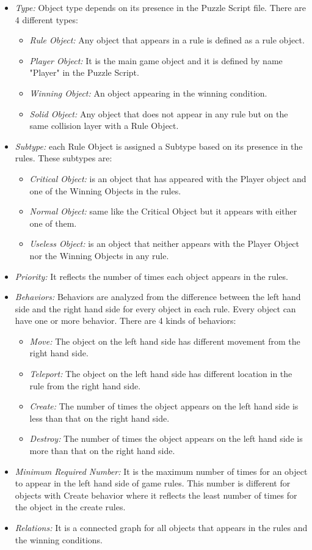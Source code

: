 \documentclass[letterpaper]{article}
\begin{document}
\begin{itemize}
	\item \emph{Type:} Object type depends on its presence in the Puzzle Script file. There are 4 different types:
	\begin{itemize}
		\item \emph{Rule Object:} Any object that appears in a rule is defined as a rule object.
		\item \emph{Player Object:} It is the main game object and it is defined by name "Player" in the Puzzle Script.
		\item \emph{Winning Object:} An object appearing in the winning condition.
		\item \emph{Solid Object:} Any object that does not appear in any rule but on the same collision layer with a Rule Object.
	\end{itemize}
	\item \emph{Subtype:} each Rule Object is assigned a Subtype based on its presence in the rules. These subtypes are:
	\begin{itemize}
		\item \emph{Critical Object:} is an object that has appeared with the Player object and one of the Winning Objects in the rules.
		\item \emph{Normal Object:} same like the Critical Object but it appears with either one of them.
		\item \emph{Useless Object:} is an object that neither appears with the Player Object nor the Winning Objects in any rule.
	\end{itemize}
	\item \emph{Priority:} It reflects the number of times each object appears in the rules.
	\item \emph{Behaviors:} Behaviors are analyzed from the difference between the left hand side and the right hand side for every object in each rule. Every object can have one or more behavior. There are 4 kinds of behaviors:
		\begin{itemize}
			\item \emph{Move:} The object on the left hand side has different movement from the right hand side.
			\item \emph{Teleport:} The object on the left hand side has different location in the rule from the right hand side.
			\item \emph{Create:} The number of times the object appears on the left hand side is less than that on the right hand side.
			\item \emph{Destroy:} The number of times the object appears on the left hand side is more than that on the right hand side.
		\end{itemize}
	\item \emph{Minimum Required Number:} It is the maximum number of times for an object to appear in the left hand side of game rules. This number is different for objects with Create behavior where it reflects the least number of times for the object in the create rules.
	\item \emph{Relations:} It is a connected graph for all objects that appears in the rules and the winning conditions.
\end{itemize}
\end{document}

